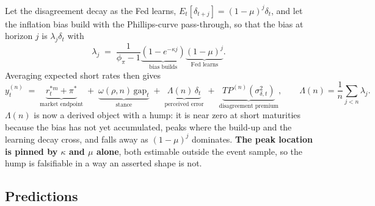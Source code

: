 Let the disagreement decay as the Fed learns, $E_t[\delta_{t+j}] = (1-\mu)^{j}\delta_t$, and let
the inflation bias build with the Phillips-curve pass-through, so that the bias at horizon $j$ is
$\lambda_j \delta_t$ with
\begin{equation}
\lambda_j \;=\; \frac{1}{\phi_\pi-1}\underbrace{\left(1-e^{-\kappa j}\right)}_{\text{bias builds}}\underbrace{\left(1-\mu\right)^{j}}_{\text{Fed learns}} .
\label{eq:lambda}
\end{equation}
Averaging expected short rates then gives
\begin{equation}
y^{(n)}_t \;=\; \underbrace{r^{*m}_t + \pi^{*}}_{\text{market endpoint}}
\;+\; \underbrace{\omega(\rho,n)\,\text{gap}_t}_{\text{stance}}
\;+\; \underbrace{\Lambda(n)\,\delta_t}_{\text{perceived error}}
\;+\; \underbrace{TP^{(n)}\!\left(\sigma^{2}_{\delta,t}\right)}_{\text{disagreement premium}} ,
\qquad \Lambda(n)=\frac1n\sum_{j<n}\lambda_j .
\label{eq:pricing}
\end{equation}
$\Lambda(n)$ is now a derived object with a hump: it is near zero at short maturities because the
bias has not yet accumulated, peaks where the build-up and the learning decay cross, and falls
away as $(1-\mu)^j$ dominates. \textbf{The peak location is pinned by $\kappa$ and $\mu$ alone},
both estimable outside the event sample, so the hump is falsifiable in a way an asserted shape
is not.

\subsection{Predictions}

